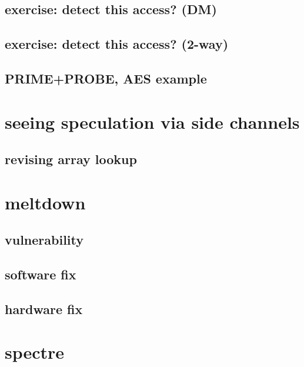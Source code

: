 

\subsection{exercise: detect this access? (DM)}

\subsection{exercise: detect this access? (2-way)}


\subsection{PRIME+PROBE, AES example}


\section{seeing speculation via side channels}

\subsection{revising array lookup}

 


\section{meltdown}

\subsection{vulnerability}

\subsection{software fix}

\subsection{hardware fix}

\section{spectre}

